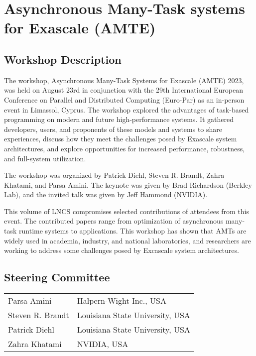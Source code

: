 \documentclass{llncs}
\begin{document}

\section*{Asynchronous Many-Task systems for Exascale (AMTE)}

\subsection*{Workshop Description}
The workshop, Asynchronous Many-Task Systems for Exascale (AMTE) 2023, was held on August 23rd in conjunction with the 29th International European Conference on Parallel and Distributed Computing (Euro-Par) as an in-person event in Limassol, Cyprus. The workshop explored the advantages of task-based programming on modern and future high-performance systems. It gathered developers, users, and proponents of these models and systems to share experiences, discuss how they meet the challenges posed by Exascale system architectures, and explore opportunities for increased performance, robustness, and full-system utilization.

The workshop was organized by Patrick Diehl, Steven R. Brandt, Zahra Khatami, and Parsa Amini. The keynote was given by Brad Richardson (Berkley Lab), and the invited talk was given by Jeff Hammond (NVIDIA). 

This volume of LNCS compromises selected contributions of attendees from this event. The contributed papers range from optimization of asynchronous many-task runtime systems to applications. This workshop has shown that AMTs are widely used in academia, industry, and national laboratories, and researchers are working to address some challenges posed by Excascale system architectures.


\subsection*{Steering Committee}
\begin{tabular}{@{}p{5cm}@{}p{7.2cm}@{}}
Parsa Amini & Halpern-Wight Inc., USA\\
Steven R. Brandt & Louisiana State University, USA\\
Patrick Diehl & Louisiana State University, USA\\
Zahra Khatami & NVIDIA, USA\\
\end{tabular}
\end{document}
